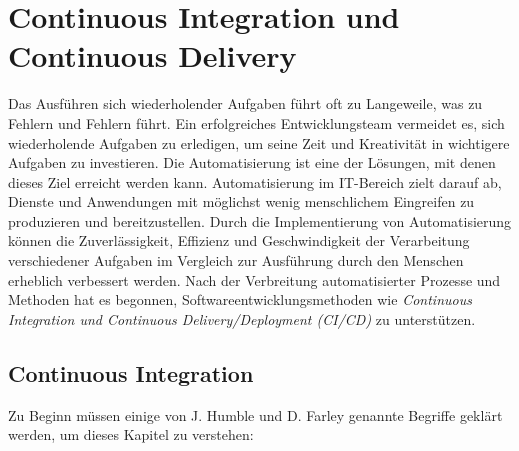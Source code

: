 \chapter{Continuous Integration und Continuous Delivery}

Das Ausführen sich wiederholender Aufgaben führt oft zu Langeweile, was zu Fehlern und Fehlern führt. Ein erfolgreiches Entwicklungsteam vermeidet es, sich wiederholende Aufgaben zu erledigen, um seine Zeit und Kreativität in wichtigere Aufgaben zu investieren. Die Automatisierung ist eine der Lösungen, mit denen dieses Ziel erreicht werden kann. Automatisierung im IT-Bereich zielt darauf ab, Dienste und Anwendungen mit möglichst wenig menschlichem Eingreifen zu produzieren und bereitzustellen. Durch die Implementierung von Automatisierung können die Zuverlässigkeit, Effizienz und Geschwindigkeit der Verarbeitung verschiedener Aufgaben im Vergleich zur Ausführung durch den Menschen erheblich verbessert werden. Nach der Verbreitung automatisierter Prozesse und Methoden hat es begonnen, Softwareentwicklungsmethoden wie \textit{Continuous Integration und Continuous Delivery/Deployment (CI/CD)} zu unterstützen.

\section{Continuous Integration}

Zu Beginn müssen einige von J. Humble und D. Farley \cite{JezHumble2010} genannte Begriffe geklärt werden, um dieses Kapitel zu verstehen:

